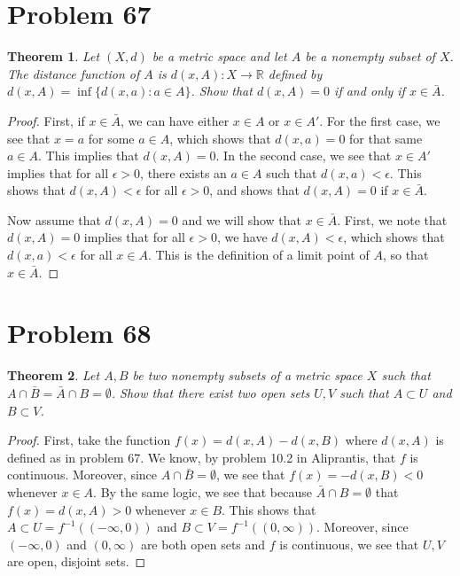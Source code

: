 \documentclass[psamsfonts]{amsart}
\newtheorem{thm}{Theorem}[section]
\theoremstyle{definition}
\theoremstyle{remark}
\numberwithin{equation}{section}
\begin{document}
\section{Problem 67}

\begin{thm}
Let $(X,d)$ be a metric space and let $A$ be a nonempty subset of $X$. The distance function of $A$ is $d(x,A): X \to \mathbb{R}$ defined by $d(x,A) = \inf \{ d(x,a): a \in A \}$. Show that $d(x,A) = 0$ if and only if $x \in \bar{A}$. 
\end{thm}

\begin{proof}
First, if $x \in \bar{A}$, we can have either $x \in A$ or $x \in A'$. For the first case, we see that $x = a$ for some $a \in A$, which shows that $d(x,a) = 0$ for that same $a \in A$. This implies that $d(x,A) = 0$. In the second case, we see that $x \in A'$ implies that for all $\epsilon > 0$, there exists an $a \in A$ such that $d(x,a) < \epsilon$. This shows that $d(x,A) < \epsilon$ for all $\epsilon > 0$, and shows that $d(x,A) = 0$ if $x \in \bar{A}$.

Now assume that $d(x,A) = 0$ and we will show that $x \in \bar{A}$. First, we note that $d(x,A)=0$ implies that for all $\epsilon > 0$, we have $d(x,A) < \epsilon$, which shows that $d(x,a) < \epsilon$ for all $x \in A$. This is the definition of a limit point of $A$, so that $x \in \bar{A}$.
\end{proof}

\section{Problem 68}

\begin{thm}
Let $A,B$ be two nonempty subsets of a metric space $X$ such that $A\cap \bar{B} = \bar{A} \cap B = \emptyset$. Show that there exist two open sets $U,V$ such that $A \subset U$ and $B \subset V$. 
\end{thm}

\begin{proof}
First, take the function $f(x) = d(x,A) - d(x,B)$ where $d(x,A)$ is defined as in problem 67. We know, by problem 10.2 in Aliprantis, that $f$ is continuous. Moreover, since $A \cap \bar{B} = \emptyset$, we see that $f(x) = - d(x,B) < 0$ whenever $x \in A$. By the same logic, we see that because $\bar{A} \cap B = \emptyset$ that $f(x) = d(x,A) > 0$ whenever $x \in B$. This shows that $A \subset U =  f^{-1}((-\infty,0))$ and $B \subset V = f^{-1} ((0,\infty))$. Moreover, since $(-\infty,0) $ and $(0,\infty)$ are both open sets and $f$ is continuous, we see that $U,V$ are open, disjoint sets.
\end{proof}
\end{document}
